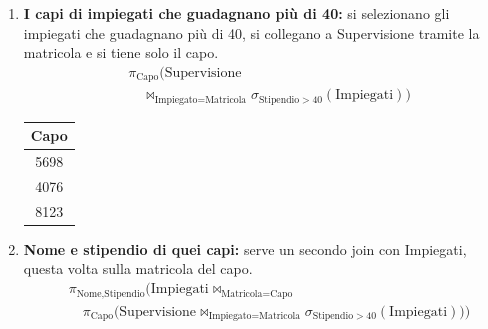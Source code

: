 \documentclass[12pt]{extarticle}
\begin{document}
\begin{enumerate}
    \item \textbf{I capi di impiegati che guadagnano più di 40:} si selezionano gli impiegati che guadagnano più di 40, si collegano a Supervisione tramite la matricola e si tiene solo il capo.
    \[
    \begin{aligned}
    & \pi_{\text{Capo}}\big(\text{Supervisione} \\
    & \quad \bowtie_{\text{Impiegato} = \text{Matricola}} \sigma_{\text{Stipendio} > 40}(\text{Impiegati})\big)
    \end{aligned}
    \]
    \begin{center}
    \qquad
    \small
    \begin{tabular}{c}
        \toprule
        \textbf{Capo} \\
        \midrule
        5698 \\
        4076 \\
        8123 \\
        \bottomrule
    \end{tabular}
    \end{center}

    \item \textbf{Nome e stipendio di quei capi:} serve un secondo join con Impiegati, questa volta sulla matricola del capo.
    \[
    \begin{aligned}
    & \pi_{\text{Nome}, \text{Stipendio}}\Big(\text{Impiegati} \bowtie_{\text{Matricola} = \text{Capo}} \\
    & \quad \pi_{\text{Capo}}\big(\text{Supervisione} \bowtie_{\text{Impiegato} = \text{Matricola}} \sigma_{\text{Stipendio} > 40}(\text{Impiegati})\big)\Big)
    \end{aligned}
    \]
    \begin{center}


\end{center}
\end{enumerate}
\end{document}
